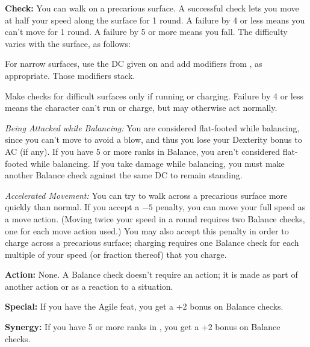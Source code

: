 \textbf{Check:} You can walk on a precarious surface. A successful check lets you move at half your speed along the surface for 1 round. A failure by 4 or less means you can't move for 1 round. A failure by 5 or more means you fall. The difficulty varies with the surface, as follows:



For narrow surfaces, use the DC given on  and add modifiers from , as appropriate. Those modifiers stack.

Make checks for difficult surfaces only if running or charging. Failure by 4 or less means the character can't run or charge, but may otherwise act normally.

\textit{Being Attacked while Balancing:} You are considered flat-footed while balancing, since you can't move to avoid a blow, and thus you lose your Dexterity bonus to AC (if any). If you have 5 or more ranks in Balance, you aren't considered flat-footed while balancing. If you take damage while balancing, you must make another Balance check against the same DC to remain standing.

\textit{Accelerated Movement:} You can try to walk across a precarious surface more quickly than normal. If you accept a $-5$ penalty, you can move your full speed as a move action. (Moving twice your speed in a round requires two Balance checks, one for each move action used.) You may also accept this penalty in order to charge across a precarious surface; charging requires one Balance check for each multiple of your speed (or fraction thereof) that you charge.

\textbf{Action:} None. A Balance check doesn't require an action; it is made as part of another action or as a reaction to a situation.

\textbf{Special:} If you have the Agile feat, you get a +2 bonus on Balance checks.

\textbf{Synergy:} If you have 5 or more ranks in , you get a +2 bonus on Balance checks.